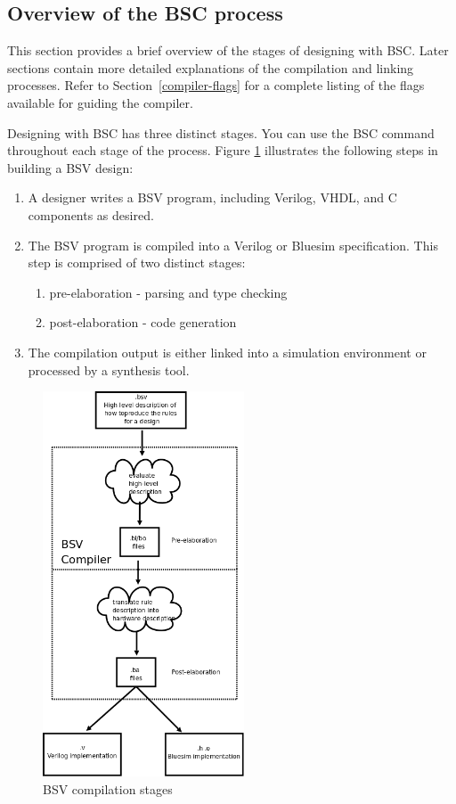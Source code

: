 \documentclass{article}
\begin{document}
\subsection{Overview of the BSC process}

This section provides a brief overview of the stages of designing with
BSC.  Later sections contain more detailed explanations of the
compilation and linking processes.  Refer to Section~\ref{compiler-flags} for  a
complete listing of the flags available for guiding the compiler.

Designing with BSC has three distinct stages.
You can use the BSC command throughout each stage of the process.
Figure \ref{compiler-stages-fig} illustrates the following
steps in building a BSV design:
\begin{enumerate}
\item A designer writes a BSV program, including Verilog, VHDL, and C components as desired.
\item The BSV program is compiled into a Verilog or Bluesim
specification. This step is comprised of two distinct stages:
\begin{enumerate}
\item pre-elaboration - parsing and type checking
\item post-elaboration - code generation
\end{enumerate}
\item  The compilation output is either linked into a simulation
environment or processed by a synthesis tool.
\end{enumerate}

\begin{figure}[ht]
  \centerline{\includegraphics[angle=0, height=4.5in]{figures/compilerstages}}
  \caption{\label{compiler-stages-fig}BSV compilation stages}
\end{figure}
\end{document}
